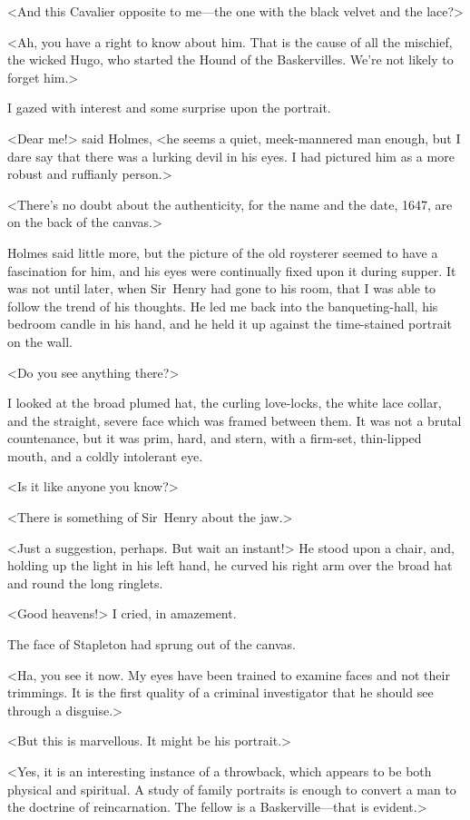 <And this Cavalier opposite to me—the one with the black velvet and the lace?>

<Ah, you have a right to know about him. That is the cause of all the mischief, the wicked Hugo, who started the Hound of the Baskervilles. We're not likely to forget him.>

I gazed with interest and some surprise upon the portrait.

<Dear me!> said Holmes, <he seems a quiet, meek-mannered man enough, but I dare say that there was a lurking devil in his eyes. I had pictured him as a more robust and ruffianly person.>

<There's no doubt about the authenticity, for the name and the date, 1647, are on the back of the canvas.>

Holmes said little more, but the picture of the old roysterer seemed to have a fascination for him, and his eyes were continually fixed upon it during supper. It was not until later, when Sir~Henry had gone to his room, that I was able to follow the trend of his thoughts. He led me back into the banqueting-hall, his bedroom candle in his hand, and he held it up against the time-stained portrait on the wall.

<Do you see anything there?>

I looked at the broad plumed hat, the curling love-locks, the white lace collar, and the straight, severe face which was framed between them. It was not a brutal countenance, but it was prim, hard, and stern, with a firm-set, thin-lipped mouth, and a coldly intolerant eye.

<Is it like anyone you know?>

<There is something of Sir~Henry about the jaw.>

<Just a suggestion, perhaps. But wait an instant!> He stood upon a chair, and, holding up the light in his left hand, he curved his right arm over the broad hat and round the long ringlets.

<Good heavens!> I cried, in amazement.

The face of Stapleton had sprung out of the canvas.

<Ha, you see it now. My eyes have been trained to examine faces and not their trimmings. It is the first quality of a criminal investigator that he should see through a disguise.>

<But this is marvellous. It might be his portrait.>

<Yes, it is an interesting instance of a throwback, which appears to be both physical and spiritual. A study of family portraits is enough to convert a man to the doctrine of reincarnation. The fellow is a Baskerville—that is evident.>

